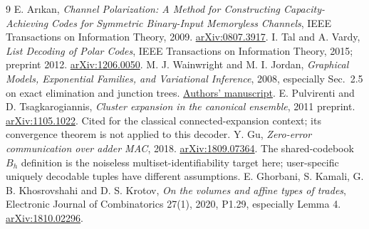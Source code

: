 \documentclass[10pt,a4paper]{article}
\begin{document}
\begin{thebibliography}{9}
\setlength{\itemsep}{0.6em}
 E. Ar{\i}kan, \emph{Channel Polarization: A Method for Constructing Capacity-Achieving Codes for
Symmetric Binary-Input Memoryless Channels}, IEEE Transactions on Information Theory, 2009.
\href{https://arxiv.org/abs/0807.3917}{arXiv:0807.3917}.
 I. Tal and A. Vardy, \emph{List Decoding of Polar Codes}, IEEE Transactions on Information Theory,
2015; preprint 2012. \href{https://arxiv.org/abs/1206.0050}{arXiv:1206.0050}.
 M. J. Wainwright and M. I. Jordan, \emph{Graphical Models, Exponential Families, and
Variational Inference}, 2008, especially Sec.~2.5 on exact elimination and junction trees.
\href{https://people.eecs.berkeley.edu/~jordan/sail/readings/wainwright-jordan-fnt.pdf}{Authors' manuscript}.
 E. Pulvirenti and D. Tsagkarogiannis, \emph{Cluster expansion in the canonical ensemble},
2011 preprint. \href{https://arxiv.org/abs/1105.1022}{arXiv:1105.1022}.
Cited for the classical connected-expansion context; its convergence theorem is not applied to this decoder.
 Y. Gu, \emph{Zero-error communication over adder MAC}, 2018.
\href{https://arxiv.org/abs/1809.07364}{arXiv:1809.07364}.
The shared-codebook $B_h$ definition is the noiseless multiset-identifiability target here;
user-specific uniquely decodable tuples have different assumptions.
 E. Ghorbani, S. Kamali, G. B. Khosrovshahi and D. S. Krotov,
\emph{On the volumes and affine types of trades}, Electronic Journal of Combinatorics 27(1), 2020, P1.29,
especially Lemma 4. \href{https://arxiv.org/abs/1810.02296}{arXiv:1810.02296}.
\end{thebibliography}
\end{document}
